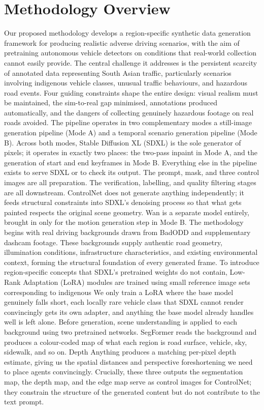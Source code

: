 \section{Methodology Overview}

Our proposed methodology develops a region-specific synthetic data generation framework for producing realistic adverse driving scenarios, with the aim of pretraining autonomous vehicle detectors on conditions that real-world collection cannot easily provide. The central challenge it addresses is the persistent scarcity of annotated data representing South Asian traffic, particularly scenarios involving indigenous vehicle classes, unusual traffic behaviours, and hazardous road events. Four guiding constraints shape the entire design: visual realism must be maintained, the sim-to-real gap minimised, annotations produced automatically, and the dangers of collecting genuinely hazardous footage on real roads avoided.
The pipeline operates in two complementary modes  a still-image generation pipeline (Mode A) and a temporal scenario generation pipeline (Mode B). Across both modes, Stable Diffusion XL (SDXL) \cite{rombach2022latentdiffusion,podell2024sdxl} is the sole generator of pixels; it operates in exactly two places: the two-pass inpaint in Mode A, and the generation of start and end keyframes in Mode B. Everything else in the pipeline exists to serve SDXL or to check its output. The prompt, mask, and three control images are all preparation. The verification, labelling, and quality filtering stages are all downstream. ControlNet does not generate anything independently; it feeds structural constraints into SDXL's denoising process so that what gets painted respects the original scene geometry. Wan is a separate model entirely, brought in only for the motion generation step in Mode B. The methodology begins with real driving backgrounds drawn from BadODD and supplementary dashcam footage. These backgrounds supply authentic road geometry, illumination conditions, infrastructure characteristics, and existing environmental context, forming the structural foundation of every generated frame.
To introduce region-specific concepts that SDXL's pretrained weights do not contain, Low-Rank Adaptation (LoRA)\cite{hu2022lora} modules are trained using small reference image sets corresponding to indigenous We only train a LoRA where the base model genuinely falls short, each locally rare vehicle class that SDXL cannot render convincingly gets its own adapter, and anything the base model already handles well is left alone.
Before generation, scene understanding is applied to each background using two pretrained networks. SegFormer reads the background and produces a colour-coded map of what each region is road surface, vehicle, sky, sidewalk, and so on. Depth Anything produces a matching per-pixel depth estimate, giving us the spatial distances and perspective foreshortening we need to place agents convincingly. Crucially, these three outputs the segmentation map, the depth map, and the edge map serve as control images for ControlNet\cite{zhang2023controlnet}; they constrain the structure of the generated content but do not contribute to the text prompt.
